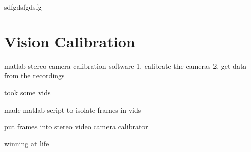 sdfgdsfgdsfg








\section{Vision Calibration}


matlab stereo camera calibration software
1. calibrate the cameras
2. get data from the recordings

took some vids

made matlab script to isolate frames in vids

put frames into stereo video camera calibrator

winning at life


